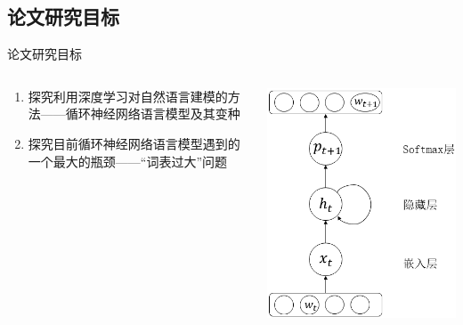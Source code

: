 \documentclass[14pt]{Bredelebeamer}
\begin{document}
\subsection{论文研究目标}
\begin{frame}{论文研究目标}
\begin{columns}
\begin{column}{.6\textwidth}
\begin{enumerate}
\item 探究利用深度学习对自然语言建模的方法——循环神经网络语言模型及其变种
\item 探究目前循环神经网络语言模型遇到的一个最大的瓶颈——“词表过大”问题
\end{enumerate}

\end{column}

\begin{column}{.4\textwidth}
\centering
\includegraphics[width=1.\textwidth]{images/rnnlm.png}
\end{column}
\end{columns}
\end{frame}
\end{document}
